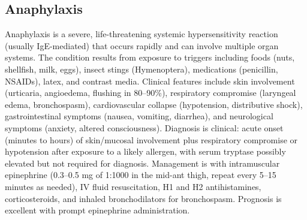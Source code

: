 






\label{sec:Hypersensitivity Disorders}

\subsection{Anaphylaxis}
\label{sec:Anaphylaxis}
Anaphylaxis is a severe, life-threatening systemic hypersensitivity reaction (usually IgE-mediated) that occurs rapidly and can involve multiple organ systems. The condition results from exposure to triggers including foods (nuts, shellfish, milk, eggs), insect stings (Hymenoptera), medications (penicillin, NSAIDs), latex, and contrast media. Clinical features include skin involvement (urticaria, angioedema, flushing in 80--90\%), respiratory compromise (laryngeal edema, bronchospasm), cardiovascular collapse (hypotension, distributive shock), gastrointestinal symptoms (nausea, vomiting, diarrhea), and neurological symptoms (anxiety, altered consciousness). Diagnosis is clinical: acute onset (minutes to hours) of skin/mucosal involvement plus respiratory compromise or hypotension after exposure to a likely allergen, with serum tryptase possibly elevated but not required for diagnosis. Management is with intramuscular epinephrine (0.3--0.5 mg of 1:1000 in the mid-ant thigh, repeat every 5--15 minutes as needed), IV fluid resuscitation, H1 and H2 antihistamines, corticosteroids, and inhaled bronchodilators for bronchospasm. Prognosis is excellent with prompt epinephrine administration.

